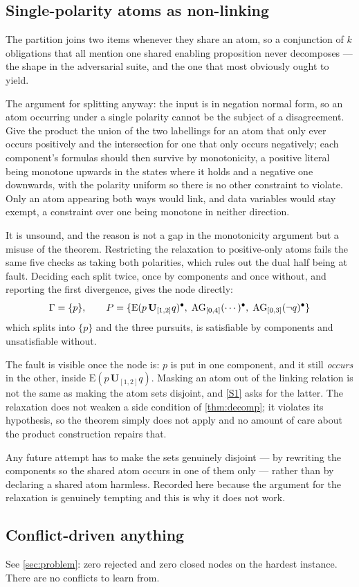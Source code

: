 \subsection{Single-polarity atoms as non-linking}

The partition joins two items whenever they share an atom, so a conjunction of
$k$ obligations that all mention one shared enabling proposition never
decomposes --- the shape  in the adversarial suite, and the one
that most obviously ought to yield.

The argument for splitting anyway: the input is in negation normal form, so an
atom occurring under a single polarity cannot be the subject of a disagreement.
Give the product the union of the two labellings for an atom that only ever
occurs positively and the intersection for one that only occurs negatively;
each component's formulas should then survive by monotonicity, a positive
literal being monotone upwards in the states where it holds and a negative one
downwards, with the polarity uniform so there is no other constraint to
violate. Only an atom appearing both ways would link, and data variables would
stay exempt, a constraint over one being monotone in neither direction.

It is unsound, and the reason is not a gap in the monotonicity argument but a
misuse of the theorem. Restricting the relaxation to positive-only atoms fails
the same five checks as taking both polarities, which rules out the dual
half being at fault. Deciding each split twice, once by components and once
without, and reporting the first divergence, gives the node directly:
\[
  \Gamma=\{p\},\qquad
  P=\{\mathrm{E}(p\,\mathbf{U}_{[1,2]}q)^{\bullet},\;
       \mathrm{AG}_{[0,4]}(\cdots)^{\bullet},\;
       \mathrm{AG}_{[0,3]}(\neg q)^{\bullet}\}
\]
which splits into $\{p\}$ and the three pursuits, is satisfiable by components
and unsatisfiable without.

The fault is visible once the node is: $p$ is put in one component, and it still
\emph{occurs} in the other, inside $\mathrm{E}(p\,\mathbf{U}_{[1,2]}q)$.
Masking an atom out of the linking relation is not the same as making the atom
sets disjoint, and \ref{S1} asks for the latter. The relaxation does not weaken
a side condition of \cref{thm:decomp}; it violates its hypothesis, so the
theorem simply does not apply and no amount of care about the product
construction repairs that.

Any future attempt has to make the sets genuinely disjoint --- by rewriting the
components so the shared atom occurs in one of them only --- rather than by
declaring a shared atom harmless. Recorded here because the argument for the
relaxation is genuinely tempting and this is why it does not work.

\subsection{Conflict-driven anything}

See \cref{sec:problem}: zero rejected and zero closed nodes on the hardest
instance. There are no conflicts to learn from.
